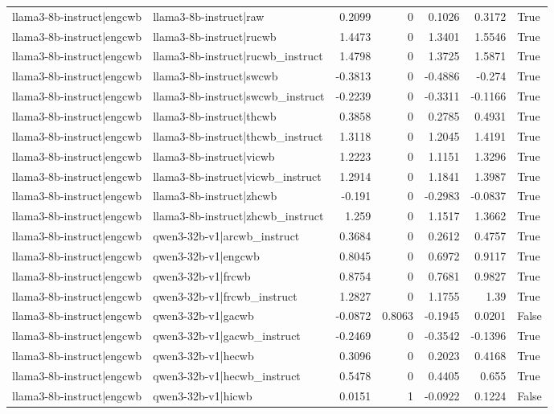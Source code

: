 \begin{table}
\begin{tabular}{l l r r r r l}
llama3-8b-instruct|engcwb & llama3-8b-instruct|raw & 0.2099 & 0 & 0.1026 & 0.3172 & True \\
llama3-8b-instruct|engcwb & llama3-8b-instruct|rucwb & 1.4473 & 0 & 1.3401 & 1.5546 & True \\
llama3-8b-instruct|engcwb & llama3-8b-instruct|rucwb_instruct & 1.4798 & 0 & 1.3725 & 1.5871 & True \\
llama3-8b-instruct|engcwb & llama3-8b-instruct|swcwb & -0.3813 & 0 & -0.4886 & -0.274 & True \\
llama3-8b-instruct|engcwb & llama3-8b-instruct|swcwb_instruct & -0.2239 & 0 & -0.3311 & -0.1166 & True \\
llama3-8b-instruct|engcwb & llama3-8b-instruct|thcwb & 0.3858 & 0 & 0.2785 & 0.4931 & True \\
llama3-8b-instruct|engcwb & llama3-8b-instruct|thcwb_instruct & 1.3118 & 0 & 1.2045 & 1.4191 & True \\
llama3-8b-instruct|engcwb & llama3-8b-instruct|vicwb & 1.2223 & 0 & 1.1151 & 1.3296 & True \\
llama3-8b-instruct|engcwb & llama3-8b-instruct|vicwb_instruct & 1.2914 & 0 & 1.1841 & 1.3987 & True \\
llama3-8b-instruct|engcwb & llama3-8b-instruct|zhcwb & -0.191 & 0 & -0.2983 & -0.0837 & True \\
llama3-8b-instruct|engcwb & llama3-8b-instruct|zhcwb_instruct & 1.259 & 0 & 1.1517 & 1.3662 & True \\
llama3-8b-instruct|engcwb & qwen3-32b-v1|arcwb_instruct & 0.3684 & 0 & 0.2612 & 0.4757 & True \\
llama3-8b-instruct|engcwb & qwen3-32b-v1|engcwb & 0.8045 & 0 & 0.6972 & 0.9117 & True \\
llama3-8b-instruct|engcwb & qwen3-32b-v1|frcwb & 0.8754 & 0 & 0.7681 & 0.9827 & True \\
llama3-8b-instruct|engcwb & qwen3-32b-v1|frcwb_instruct & 1.2827 & 0 & 1.1755 & 1.39 & True \\
llama3-8b-instruct|engcwb & qwen3-32b-v1|gacwb & -0.0872 & 0.8063 & -0.1945 & 0.0201 & False \\
llama3-8b-instruct|engcwb & qwen3-32b-v1|gacwb_instruct & -0.2469 & 0 & -0.3542 & -0.1396 & True \\
llama3-8b-instruct|engcwb & qwen3-32b-v1|hecwb & 0.3096 & 0 & 0.2023 & 0.4168 & True \\
llama3-8b-instruct|engcwb & qwen3-32b-v1|hecwb_instruct & 0.5478 & 0 & 0.4405 & 0.655 & True \\
llama3-8b-instruct|engcwb & qwen3-32b-v1|hicwb & 0.0151 & 1 & -0.0922 & 0.1224 & False \\

\end{tabular}
\end{table}
